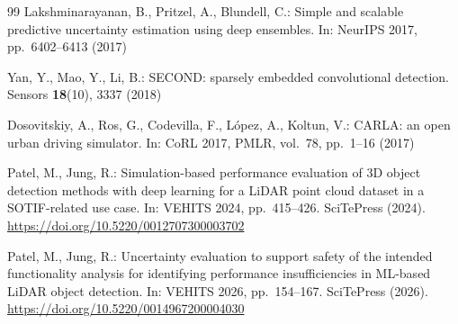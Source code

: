 \documentclass[runningheads]{llncs}
\begin{document}
\begin{thebibliography}{99}
		Lakshminarayanan, B., Pritzel, A., Blundell, C.: Simple and scalable predictive uncertainty estimation using deep ensembles. In: NeurIPS 2017, pp.~6402--6413 (2017)
		
		Yan, Y., Mao, Y., Li, B.: SECOND: sparsely embedded convolutional detection. Sensors \textbf{18}(10), 3337 (2018)
		
		Dosovitskiy, A., Ros, G., Codevilla, F., L\'{o}pez, A., Koltun, V.: CARLA: an open urban driving simulator. In: CoRL 2017, PMLR, vol.~78, pp.~1--16 (2017)
		
		Patel, M., Jung, R.: Simulation-based performance evaluation of 3D object detection methods with deep learning for a LiDAR point cloud dataset in a SOTIF-related use case. In: VEHITS 2024, pp.~415--426. SciTePress (2024). \url{https://doi.org/10.5220/0012707300003702}
		
		Patel, M., Jung, R.: Uncertainty evaluation to support safety of the intended functionality analysis for identifying performance insufficiencies in ML-based LiDAR object detection. In: VEHITS 2026, pp.~154--167. SciTePress (2026). \url{https://doi.org/10.5220/0014967200004030}
		
	\end{thebibliography}
	
\end{document}
